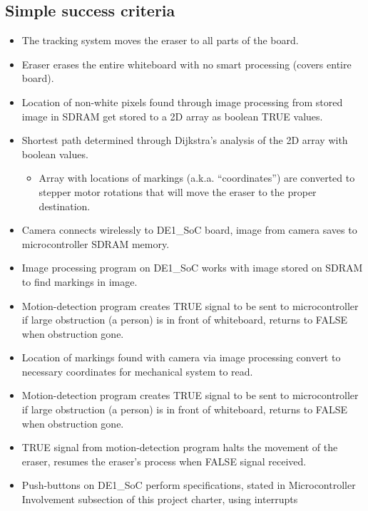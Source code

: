 \subsection{Simple success criteria}
\begin{itemize}
\item The tracking system moves the eraser to all parts of the board. 
\item Eraser erases the entire whiteboard with no smart processing (covers entire board).
\item Location of non-white pixels found through image processing from stored image in SDRAM get stored to a 2D array as boolean TRUE values.
\item Shortest path determined through Dijkstra’s analysis of the 2D array with boolean values.
\begin{itemize}
	\item Array with locations of markings (a.k.a. “coordinates”) are converted to stepper motor rotations that will move the eraser to the proper destination.
\end{itemize}
\item Camera connects wirelessly to DE1\_SoC board, image from camera saves to microcontroller SDRAM memory.
\item Image processing program on DE1\_SoC works with image stored on SDRAM to find markings in image.
\item Motion-detection program creates TRUE signal to be sent to microcontroller if large obstruction (a person) is in front of whiteboard, returns to FALSE when obstruction gone.
\item Location of markings found with camera via image processing convert to necessary coordinates for mechanical system to read.
\item Motion-detection program creates TRUE signal to be sent to microcontroller if large obstruction (a person) is in front of whiteboard, returns to FALSE when obstruction gone.
\item TRUE signal from motion-detection program halts the movement of the eraser, resumes the eraser's process when FALSE signal received.
\item Push-buttons on DE1\_SoC perform specifications, stated in Microcontroller Involvement subsection of this project charter, using interrupts \\
\end{itemize}


